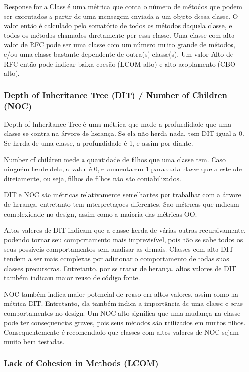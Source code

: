 Response for a Class é uma métrica que conta o número de métodos que podem ser executados a partir de uma mensagem enviada a um objeto dessa classe. O valor então é calculado pelo somatório de todos os métodos daquela classe, e todos os métodos chamados diretamente por essa classe. Uma classe com alto valor de RFC pode ser uma classe com um número muito grande de métodos, e/ou uma classe bastante dependente de outra(s) classe(s). Um valor Alto de RFC então pode indicar baixa coesão (LCOM alto) e alto acoplamento (CBO alto). 

\subsubsection{Depth of Inheritance Tree (DIT) / Number of Children (NOC)}

Depth of Inheritance Tree é uma métrica que mede a profundidade que uma classe se contra na árvore de herança. Se ela não herda nada, tem DIT igual a 0. Se herda de uma classe, a profundidade é 1, e assim por diante. 

Number of children mede a quantidade de filhos que uma classe tem. Caso ninguém herde dela, o valor é 0, e aumenta em 1 para cada classe que a estende diretamente, ou seja, filhos de filhos não são contabilizados.

DIT e NOC são métricas relativamente semelhantes por trabalhar com a árvore de herança, entretanto tem interpretações diferentes. São métricas que indicam complexidade no design, assim como a maioria das métricas OO.

Altos valores de DIT indicam que a classe herda de várias outras recursivamente, podendo tornar seu comportamento mais imprevisível, pois não se sabe todos os seus possíveis comportamentos sem analisar as demais. Classes com alto DIT tendem a ser mais complexas por adicionar o comportamento de todas suas classes precursoras. Entretanto, por se tratar de herança, altos valores de DIT também indicam maior reuso de código fonte.

NOC também indica maior potencial de reuso em altos valores, assim como na métrica DIT. Entretanto, ela também indica a importância de uma classe e seus comportamentos no design. Um NOC alto significa que uma mudança na classe pode ter consequencias graves, pois seus métodos são utilizados em muitos filhos. Consequentemente é recomendado que classes com altos valores de NOC sejam muito bem testadas.


\subsubsection{Lack of Cohesion in Methods (LCOM)}

